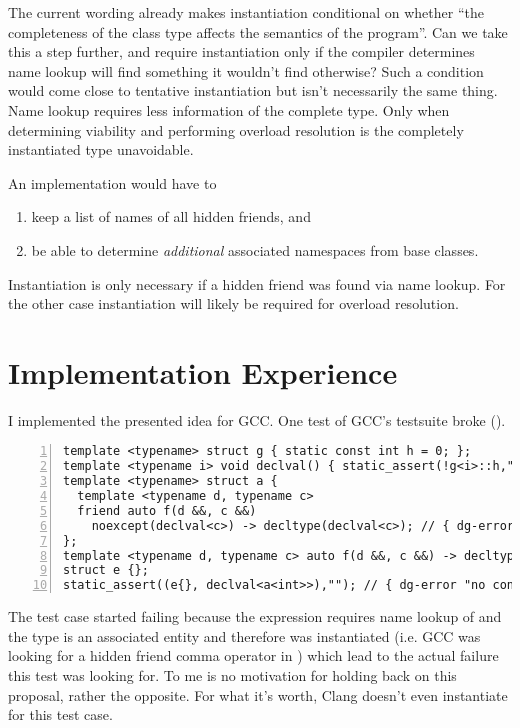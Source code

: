 The current wording already makes instantiation conditional on whether “the completeness 
of the class type affects the semantics of the program”. Can we take this a step further, 
and require instantiation only if the compiler determines name lookup will find something 
it wouldn't find otherwise? Such a condition would come close to tentative instantiation 
but isn't necessarily the same thing. Name lookup requires less information of the 
complete type. Only when determining viability and performing overload resolution is the 
completely instantiated type unavoidable.

An implementation would have to
\begin{enumerate}
\item keep a list of names of all hidden friends, and
\item be able to determine \emph{additional} associated namespaces from base classes.
\end{enumerate}
Instantiation is only necessary if a hidden friend was found via name lookup. For the 
other case instantiation will likely be required for overload resolution.

\section{Implementation Experience}
I implemented the presented idea for GCC. One test of GCC's testsuite broke 
().
\begin{lstlisting}[style=Vc,numbers=left,float,label=lst:noexcept41,caption={
GCC test that broke after implementation of less eager ADL (\code{declval<a<int>>} without 
parenthesis is no error --- with parenthesis \code{a<int>} isn't an associated entity)}]
template <typename> struct g { static const int h = 0; };
template <typename i> void declval() { static_assert(!g<i>::h,""); }
template <typename> struct a {
  template <typename d, typename c>
  friend auto f(d &&, c &&)
    noexcept(declval<c>) -> decltype(declval<c>); // { dg-error "different exception" }
};
template <typename d, typename c> auto f(d &&, c &&) -> decltype(declval<c>);
struct e {};
static_assert((e{}, declval<a<int>>),""); // { dg-error "no context to resolve type" }
\end{lstlisting}
The test case started failing because the expression  
requires name lookup of  and the type  is an associated 
entity and therefore was instantiated (i.e. GCC was looking for a hidden friend comma 
operator in ) which lead to the actual failure this test was looking for. To 
me  is no motivation for holding back on this proposal, rather the 
opposite. For what it's worth, Clang doesn't even instantiate  for this test 
case.

